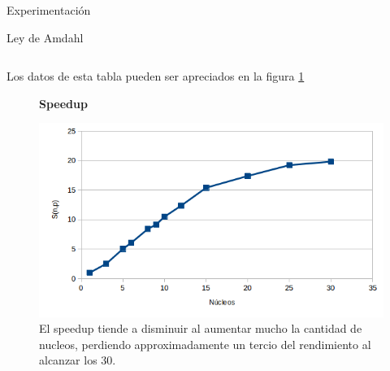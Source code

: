 \begin{section}{Experimentación}
\begin{subsection}{Ley de Amdahl}
\begin{minipage}{\linewidth}
\begin{tcolorbox}[colback=blue!5!white,colframe=blue!75!black,title=Speedup]
\begin{verbatim}
\end{verbatim}
\end{tcolorbox}
\end{minipage}
Los datos de esta tabla pueden ser apreciados en la figura \ref{fig:exp_amdahl_speedup}
\\

\begin{figure}
\textbf{Speedup}

\includegraphics[width=\textwidth/2,height=\textheight/2,keepaspectratio]{figures/exp_amdahl_speedup}
\caption{El speedup tiende a disminuir al aumentar mucho la cantidad de nucleos, perdiendo approximadamente un tercio del rendimiento al alcanzar los 30.}
\label{fig:exp_amdahl_speedup}

\end{figure}

\end{subsection}



\end{section}
